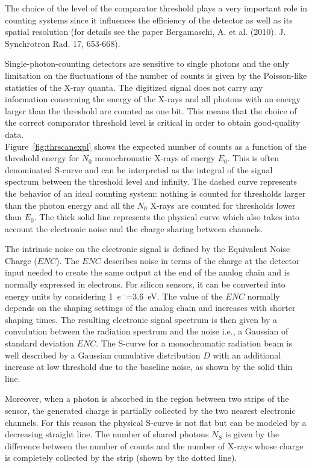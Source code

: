 
The choice of the level of the comparator threshold plays a very important role in counting systems since it influences the efficiency of the detector as well as its spatial resolution (for details see the paper Bergamaschi, A. et al. (2010). J. Synchrotron Rad. 17, 653-668).


Single-photon-counting detectors are sensitive to single photons and the only limitation on the fluctuations of the number of counts is given by the Poisson-like statistics of the X-ray quanta. 
The digitized signal does not carry any information concerning the energy of the X-rays and all photons with an energy larger than the threshold are counted as one bit. This means that the choice of the correct comparator threshold level is critical in order to obtain good-quality data.\\
 Figure~\ref{fig:thrscanexpl} shows the expected number of counts as a function of the threshold energy for $N_0$ monochromatic X-rays of energy $E_0$. This is often denominated  S-curve and can be interpreted as the integral of the signal spectrum between the threshold level and infinity.
The dashed curve represents the behavior of an ideal counting system: nothing is counted for thresholds larger than the photon energy and all the $N_0$ X-rays are counted for thresholds lower than $E_0$.
The thick solid line represents the physical curve which also takes into account the electronic noise and the charge sharing between channels.

The intrinsic noise on the electronic signal  is defined by the Equivalent Noise Charge ($ENC$). The $ENC$ describes noise in terms of the charge at the detector input needed to create the same output at the end of the analog chain and is normally expressed in electrons. For silicon sensors, it can be converted into energy units by considering 1~$e^-$=3.6~eV.
The value of the $ENC$ normally depends on the shaping settings of the analog chain and increases with shorter shaping times. 
The resulting electronic signal spectrum is then  given by a convolution between the radiation spectrum and the noise i.e., a Gaussian of standard deviation $ENC$.  
The S-curve for a monochromatic radiation beam is well described by a Gaussian cumulative distribution $D$ with an additional increase at low threshold due to the baseline noise, as shown by the solid thin line. 

Moreover, when a photon is absorbed in the region between two strips of the sensor, the generated charge is partially collected by the two nearest electronic channels. For this reason the physical S-curve is not flat but can be modeled by a decreasing straight line. The number of shared photons  $N_S$ is given by the difference between the number of counts and the number of X-rays whose charge is completely collected by the strip (shown by the dotted line).

